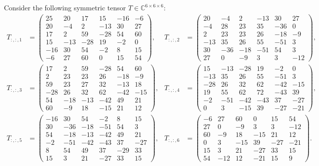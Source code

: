 Consider the following symmetric tensor $T\in \mathbb C^{6\times 6\times 6}$:
\begin{align*}
T_{:,:,1} &= \begin{pmatrix} 25 & 20 & 17 & 15 & -16 & -6 \\ 20 & -4 & 2 & -13 & 30 & 27 \\ 17 & 2 & 59 & -28 & 54 & 60 \\ 15 & -13 & -28 & 19 & -2 & 0 \\ -16 & 30 & 54 & -2 & 8 & 15 \\ -6 & 27 & 60 & 0 & 15 & 54 \end{pmatrix}, & T_{:,:,2} &= \begin{pmatrix} 20 & -4 & 2 & -13 & 30 & 27 \\ -4 & 28 & 23 & 35 & -36 & 0 \\ 2 & 23 & 23 & 26 & -18 & -9 \\ -13 & 35 & 26 & 55 & -51 & 3 \\ 30 & -36 & -18 & -51 & 54 & 3 \\ 27 & 0 & -9 & 3 & 3 & -12 \end{pmatrix},\\[1ex]
T_{:,:,3} &= \begin{pmatrix} 17 & 2 & 59 & -28 & 54 & 60 \\ 2 & 23 & 23 & 26 & -18 & -9 \\ 59 & 23 & 27 & 32 & -13 & 18 \\ -28 & 26 & 32 & 62 & -42 & -15 \\ 54 & -18 & -13 & -42 & 49 & 21 \\ 60 & -9 & 18 & -15 & 21 & 12 \end{pmatrix}, & T_{:,:,4} &= \begin{pmatrix} 15 & -13 & -28 & 19 & -2 & 0 \\ -13 & 35 & 26 & 55 & -51 & 3 \\ -28 & 26 & 32 & 62 & -42 & -15 \\ 19 & 55 & 62 & 72 & -43 & 39 \\ -2 & -51 & -42 & -43 & 37 & -27 \\ 0 & 3 & -15 & 39 & -27 & -21 \end{pmatrix},\\[1ex]
T_{:,:,5} &= \begin{pmatrix} -16 & 30 & 54 & -2 & 8 & 15 \\ 30 & -36 & -18 & -51 & 54 & 3 \\ 54 & -18 & -13 & -42 & 49 & 21 \\ -2 & -51 & -42 & -43 & 37 & -27 \\ 8 & 54 & 49 & 37 & -29 & 33 \\ 15 & 3 & 21 & -27 & 33 & 15 \end{pmatrix}, & T_{:,:,6} &= \begin{pmatrix} -6 & 27 & 60 & 0 & 15 & 54 \\ 27 & 0 & -9 & 3 & 3 & -12 \\ 60 & -9 & 18 & -15 & 21 & 12 \\ 0 & 3 & -15 & 39 & -27 & -21 \\ 15 & 3 & 21 & -27 & 33 & 15 \\ 54 & -12 & 12 & -21 & 15 & 9 \end{pmatrix}.
\end{align*}
